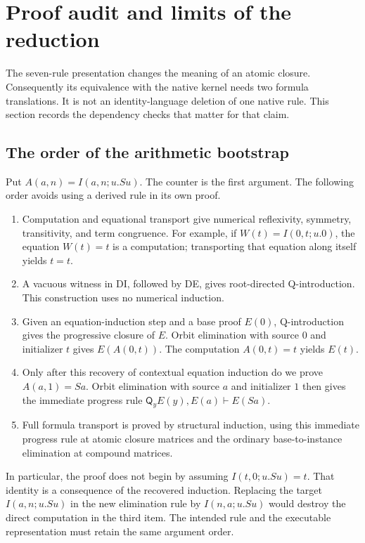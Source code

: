 \section{Proof audit and limits of the reduction}
\label{sec:proof-audit}

The seven-rule presentation changes the meaning of an atomic closure.
Consequently its equivalence with the native kernel needs two formula
translations.  It is not an identity-language deletion of one native rule.
This section records the dependency checks that matter for that claim.

\subsection{The order of the arithmetic bootstrap}

Put $A(a,n)=I(a,n;u.Su)$.  The counter is the first argument.
The following order avoids using a derived rule in its own proof.
\begin{enumerate}
\item Computation and equational transport give numerical reflexivity,
      symmetry, transitivity, and term congruence.  For example, if
      $W(t)=I(0,t;u.0)$, the equation $W(t)=t$ is a computation;
      transporting that equation along itself yields $t=t$.
\item A vacuous witness in DI, followed by DE, gives root-directed
      Q-introduction.  This construction uses no numerical induction.
\item Given an equation-induction step and a base proof $E(0)$,
      Q-introduction gives the progressive closure of $E$.  Orbit
      elimination with source $0$ and initializer $t$ gives
      $E(A(0,t))$.  The computation $A(0,t)=t$ yields $E(t)$.
\item Only after this recovery of contextual equation induction do we
      prove $A(a,1)=Sa$.  Orbit elimination with source $a$ and initializer
      $1$ then gives the immediate progress rule
      $\mathsf Q_yE(y),E(a)\vdash E(Sa)$.
\item Full formula transport is proved by structural induction, using
      this immediate progress rule at atomic closure matrices and the
      ordinary base-to-instance elimination at compound matrices.
\end{enumerate}

In particular, the proof does not begin by assuming $I(t,0;u.Su)=t$.
That identity is a consequence of the recovered induction.  Replacing
the target $I(a,n;u.Su)$ in the new elimination rule by
$I(n,a;u.Su)$ would destroy the direct computation in the third item.
The intended rule and the executable representation must retain the
same argument order.

